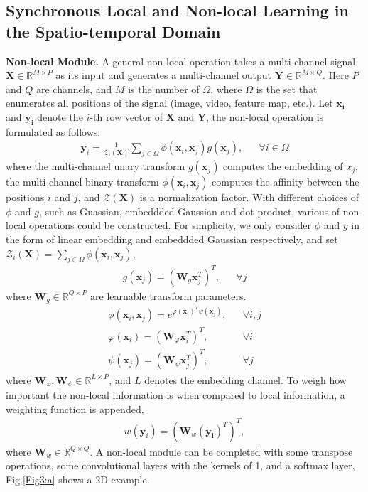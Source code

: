 \documentclass{article}
\begin{document}
\subsection{Synchronous Local and Non-local Learning in the Spatio-temporal Domain}
\textbf{Non-local Module.}
A general non-local operation takes a multi-channel signal {\myfont$ \bm{X}\in \mathbb{R}^{M \times P} $} as its input and generates a multi-channel output {\myfont$ \bm{Y}\in \mathbb{R}^{M \times Q} $}. Here {\myfont$ P $} and  {\myfont$ Q $} are channels, and {\myfont$ M $} is the number of {\myfont$ \Omega $}, where {\myfont$ \Omega $} is the set that enumerates all positions of the signal (image, video, feature map, etc.). Let {\myfont$ \bm{x_i} $} and {\myfont$ \bm{y_i} $} denote the $ i $-th row vector of  {\myfont$ \bm{X} $} and {\myfont$ \bm{Y} $}, the non-local operation is formulated as follows:
{\myfont
	\begin{align}
	\bm{y}_i = \frac{1}{\mathcal{Z}_i(\bm{X})}\sum_{j \in \Omega} \phi (\bm{x}_i,\bm{x}_j) g(\bm{x}_j), && \forall i \in \Omega
	\end{align}
}where the multi-channel unary transform {\myfont$ g(\bm{x}_j) $} computes the embedding of $ x_j $, the multi-channel binary transform {\myfont$ \phi (\bm{x}_i,\bm{x}_j) $} computes the affinity between the positions $ i $ and $ j $, and {\myfont$ \mathcal{Z}(\bm{X}) $} is a normalization factor. With different choices of $ \phi $ and $ g $, such as Guassian, embeddded Gaussian and dot product, various of non-local operations could be constructed. For simplicity, we only consider $ \phi $ and $ g $ in the form of linear embedding and embeddded Gaussian respectively, and set {\myfont$ \mathcal{Z}_i(\bm{X}) =\sum_{j\in \Omega}\phi (\bm{x}_i,\bm{x}_j) $}, \ie~
{\myfont
	\begin{align}
	g(\bm{x}_j)= (\bm{W}_g \bm{x}_j^T)^T, && \forall j
	\end{align}
}where {\myfont$ \bm{W}_g \in \mathbb{R}^{Q \times P} $} are learnable transform parameters.
{\myfont
	\begin{align}
	\phi (\bm{x}_i,\bm{x}_j) = e^{\varphi(\bm{x}_i)^T \psi(\bm{x}_j)},  && \forall i,j\\
	\varphi(\bm{x}_i) = (\bm{W}_{\varphi} \bm{x}_i^T)^T,  && \forall i\\
	\psi(\bm{x}_j) = (\bm{W}_{\psi} \bm{x}_j^T)^T,  && \forall j
	\end{align}
}where {\myfont$ \bm{W}_{\varphi},\bm{W}_{\psi} \in \mathbb{R}^{L \times P} $}, and $ L $ denotes the embedding channel. To weigh how important the non-local information is when compared to local information, a weighting function is appended,
\ie~
{\myfont
	\begin{align}
	w(\bm{y}_i) = (\bm{W}_w (\bm{y_i})^T)^T,
	\end{align}
}where {\myfont$ \bm{W}_{w} \in \mathbb{R}^{Q \times Q} $}. A non-local module can be completed with some transpose operations, some convolutional layers with the kernels of 1, and a softmax layer, Fig.\ref{Fig3:a} shows a 2D example.
\end{document}
